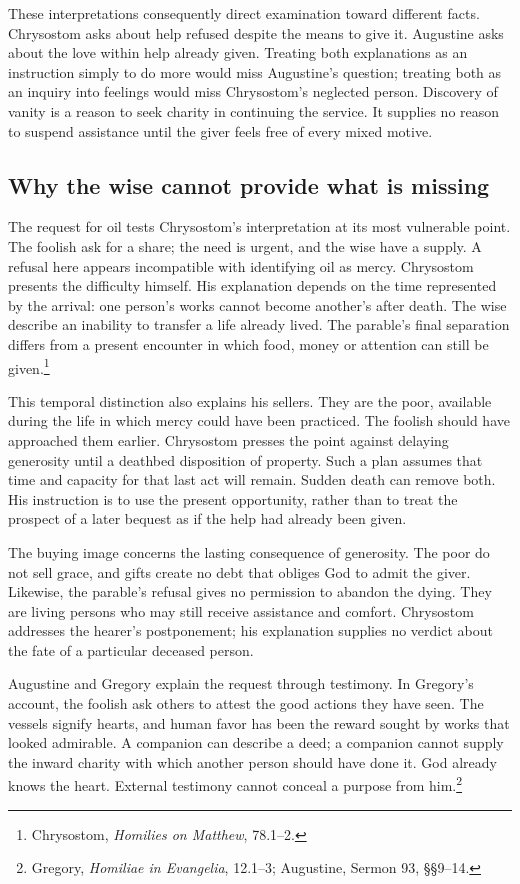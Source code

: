 These interpretations consequently direct examination toward different facts. Chrysostom asks about help refused despite the means to give it. Augustine asks about the love within help already given. Treating both explanations as an instruction simply to do more would miss Augustine's question; treating both as an inquiry into feelings would miss Chrysostom's neglected person. Discovery of vanity is a reason to seek charity in continuing the service. It supplies no reason to suspend assistance until the giver feels free of every mixed motive.

\subsection{Why the wise cannot provide what is missing}
The request for oil tests Chrysostom's interpretation at its most vulnerable point. The foolish ask for a share; the need is urgent, and the wise have a supply. A refusal here appears incompatible with identifying oil as mercy. Chrysostom presents the difficulty himself. His explanation depends on the time represented by the arrival: one person's works cannot become another's after death. The wise describe an inability to transfer a life already lived. The parable's final separation differs from a present encounter in which food, money or attention can still be given.\footnote{Chrysostom, \textit{Homilies on Matthew}, 78.1--2.}

This temporal distinction also explains his sellers. They are the poor, available during the life in which mercy could have been practiced. The foolish should have approached them earlier. Chrysostom presses the point against delaying generosity until a deathbed disposition of property. Such a plan assumes that time and capacity for that last act will remain. Sudden death can remove both. His instruction is to use the present opportunity, rather than to treat the prospect of a later bequest as if the help had already been given.

The buying image concerns the lasting consequence of generosity. The poor do not sell grace, and gifts create no debt that obliges God to admit the giver. Likewise, the parable's refusal gives no permission to abandon the dying. They are living persons who may still receive assistance and comfort. Chrysostom addresses the hearer's postponement; his explanation supplies no verdict about the fate of a particular deceased person.

Augustine and Gregory explain the request through testimony. In Gregory's account, the foolish ask others to attest the good actions they have seen. The vessels signify hearts, and human favor has been the reward sought by works that looked admirable. A companion can describe a deed; a companion cannot supply the inward charity with which another person should have done it. God already knows the heart. External testimony cannot conceal a purpose from him.\footnote{Gregory, \textit{Homiliae in Evangelia}, 12.1--3; Augustine, Sermon 93, §§9--14.}

